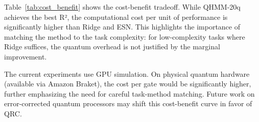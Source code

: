 
Table~\ref{tab:cost_benefit} shows the cost-benefit tradeoff. While
QHMM-20q achieves the best R², the computational cost per unit of
performance is significantly higher than Ridge and ESN. This highlights
the importance of matching the method to the task complexity: for
low-complexity tasks where Ridge suffices, the quantum overhead is not
justified by the marginal improvement.



The current experiments use GPU simulation. On physical quantum hardware
(available via Amazon Braket), the cost per gate would be significantly
higher, further emphasizing the need for careful task-method matching.
Future work on error-corrected quantum processors may shift this
cost-benefit curve in favor of QRC.

